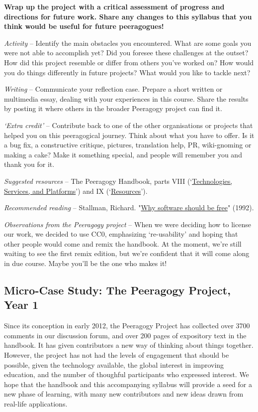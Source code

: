 \textbf{Wrap up the project with a critical assessment of progress and
directions for future work. Share any changes to this syllabus that you
think would be useful for future peeragogues!}

\emph{Activity} -- Identify the main obstacles you encountered. What are
some goals you were not able to accomplish yet? Did you foresee these
challenges at the outset? How did this project resemble or differ from
others you've worked on? How would you do things differently in future
projects? What would you like to tackle next?

\emph{Writing} -- Communicate your reflection case. Prepare a short
written or multimedia essay, dealing with your experiences in this
course. Share the results by posting it where others in the broader
Peeragogy project can find it.

\emph{`Extra credit'} -- Contribute back to one of the other
organisations or projects that helped you on this peeragogical journey.
Think about what you have to offer. Is it a bug fix, a constructive
critique, pictures, translation help, PR, wiki-gnoming or making a cake?
Make it something special, and people will remember you and thank you
for it.

\emph{Suggested resources} -- The Peeragogy Handbook, parts VIII
(`\href{http://peeragogy.org/resources/technologies/}{Technologies,
Services, and Platforms}') and IX
(`\href{http://peeragogy.org/resources/}{Resources}').

\emph{Recommended reading} -- Stallman, Richard.
"\href{http://www.gnu.org/philosophy/shouldbefree.html}{Why software
should be free}" (1992).

\emph{Observations from the Peeragogy project} -- When we were deciding
how to license our work, we decided to use CC0, emphasizing
`re-usability' and hoping that other people would come and remix the
handbook. At the moment, we're still waiting to see the first remix
edition, but we're confident that it will come along in due course.
Maybe you'll be the one who makes it!

\subsection{Micro-Case Study: The Peeragogy Project, Year 1}

Since its conception in early 2012, the Peeragogy Project has collected
over 3700 comments in our discussion forum, and over 200 pages of
expository text in the handbook. It has given contributors a new way of
thinking about things together. However, the project has not had the
levels of engagement that should be possible, given the technology
available, the global interest in improving education, and the number of
thoughful participants who expressed interest. We hope that the handbook
and this accompanying syllabus will provide a seed for a new phase of
learning, with many new contributors and new ideas drawn from real-life
applications.

